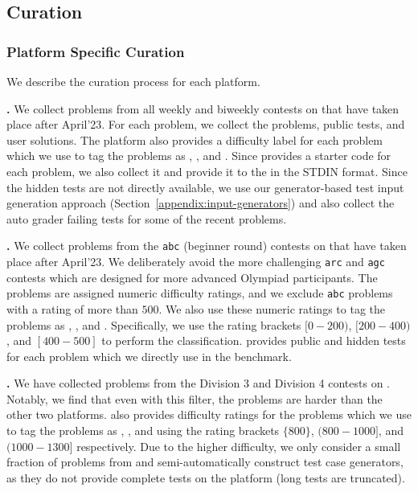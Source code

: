 \subsection{Curation}
\label{app:sec:curation}



\subsubsection{Platform Specific Curation}
\label{subsec:platform-specific}
We describe the curation process for each platform.

\vspace{2pt}
\noindent \textbf{\leetcode{}.}
We collect problems from all weekly and biweekly contests on \leetcode{} that have taken place after April'23.
For each problem, we collect the problems, public tests, and user solutions.
The platform also provides a difficulty label for each problem which we use to tag the problems as \easy{}, \medium{}, and \hard{}.
Since \leetcode{} provides a starter code for each problem, we also collect it and provide it to the \llm{} in the STDIN format.
Since the hidden tests are not directly available, we use our generator-based test input generation approach (Section~\ref{appendix:input-generators}) and also collect the auto grader failing tests for some of the recent problems.

\vspace{2pt}
\noindent \textbf{\atcoder{}.}
We collect problems from the \texttt{abc} (beginner round) contests on \atcoder{} that have taken place after April'23. 
We deliberately avoid the more challenging \texttt{arc} and \texttt{agc} contests which are designed for more advanced Olympiad participants.
The problems are assigned numeric difficulty ratings, and we exclude \texttt{abc} problems with a rating of more than $500$.
We also use these numeric ratings to tag the problems as \easy{}, \medium{}, and \hard{}.
Specifically, we use the rating brackets $[0-200)$, $[200-400)$, and $[400-500]$ to perform the classification.
\atcoder{} provides public and hidden tests for each problem which we directly use in the benchmark.

\vspace{2pt}
\noindent \textbf{\codeforces{}.}
We have collected problems from the Division 3 and Division 4 contests on \codeforces{}.
Notably, we find that even with this filter, the problems are harder than the other two platforms.
\codeforces{} also provides difficulty ratings for the problems which we use to tag the problems as \easy{}, \medium{}, and \hard{} using the rating brackets $\{800\}$, $(800-1000]$, and $(1000-1300]$ respectively.
Due to the higher difficulty, we only consider a small fraction of problems from \codeforces{} and semi-automatically construct test case generators, as they do not provide complete tests on the platform (long tests are truncated).

